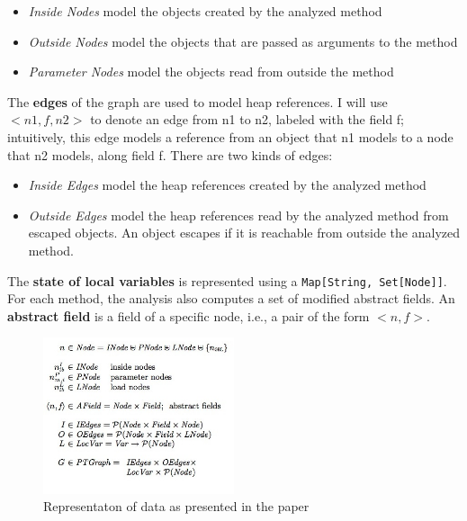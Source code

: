 \documentclass[11pt]{exam}
\begin{document}
\begin{itemize}
  \setlength{\itemsep}{1pt}
  \setlength{\parskip}{0pt}
  \item \emph{Inside Nodes} model the objects created by the analyzed method
  \item \emph{Outside Nodes} model the objects that are passed as arguments 
        to the method
  \item \emph{Parameter Nodes} model the objects read from outside the method
\end{itemize}

The \textbf{edges} of the graph are used to model heap references. I will use
$<n1,f,n2>$ to denote an edge from n1 to n2, labeled with the field f;
intuitively, this edge models a reference from an object that n1
models to a node that n2 models, along field f. There are two kinds of
edges:

\begin{itemize}
  \setlength{\itemsep}{1pt}
  \setlength{\parskip}{0pt}
  \item \emph{Inside Edges} model the heap references created by the analyzed 
        method
  \item \emph{Outside Edges} model the heap references read by the analyzed 
        method from escaped objects. An object escapes if it is reachable 
        from outside the analyzed method.
\end{itemize}

The \textbf{state of local variables} is represented using a
\texttt{Map[String, Set[Node]]}. For each method, the analysis also
computes a set of modified abstract fields. An \textbf{abstract field}
is a field of a specific node, i.e., a pair of the form $<n,f>$.

\begin{figure}[h!]
\begin{center}
  \includegraphics[width=0.5\textwidth]{data-representation}
\end{center}
\caption{Representaton of data as presented in the paper}
\label{data-notation}
\end{figure}
\end{document}
